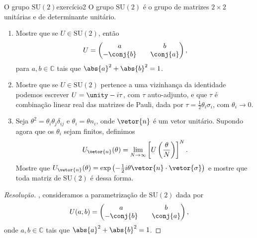 \begin{exercício}{O grupo \(\mathrm{SU}(2)\)}{exercício2}
    O grupo \(\mathrm{SU}(2)\) é o grupo de matrizes \(2\times 2\) unitárias e de determinante unitário.
    \begin{enumerate}[label=(\alph*)]
        \item Mostre que se \(U \in \mathrm{SU}(2)\), então
            \begin{equation*}
                U = \begin{pmatrix}
                    a && b\\
                    -\conj{b} && \conj{a}
                \end{pmatrix},
            \end{equation*}
            para \(a,b \in \mathbb{C}\) tais que \(\abs{a}^2 + \abs{b}^2 = 1\).
        \item Mostre que se \(U \in \mathrm{SU}(2)\) pertence a uma vizinhança da identidade podemos escrever \(U = \unity - i \tau\), com \(\tau\) auto-adjunto, e que \(\tau\) é combinação linear real das matrizes de Pauli, dada por \(\tau = \frac12 \theta_i \sigma_i\), com \(\theta_i \to 0\).
        \item Seja \(\theta^2 = \theta_i \theta_j \delta_{ij}\) e \(\theta_i = \theta n_i\), onde \(\vetor{n}\) é um vetor unitário. Supondo agora que os \(\theta_i\) sejam finitos, definimos
            \begin{equation*}
                U_{\vetor{n}}(\theta) = \lim_{N\to \infty} \left[U\left(\frac{\theta}{N}\right)\right]^N.
            \end{equation*}
            Mostre que \(U_{\vetor{n}}(\theta) = \exp\left(-\frac12i\theta \vetor{n} \cdot \vetor{\sigma}\right)\) e mostre que toda matriz de \(\mathrm{SU}(2)\) é dessa forma.
    \end{enumerate}
\end{exercício}
\begin{proof}[Resolução]
    , consideramos a parametrização  de \(\mathrm{SU}(2)\) dada por
    \begin{equation*}
        U(a,b) = \begin{pmatrix}
            a && b\\
            -\conj{b}&&\conj{a}
        \end{pmatrix},
    \end{equation*}
    onde \(a,b \in \mathbb{C}\) tais que \(\abs{a}^2 + \abs{b}^2 = 1\).
\end{proof}
